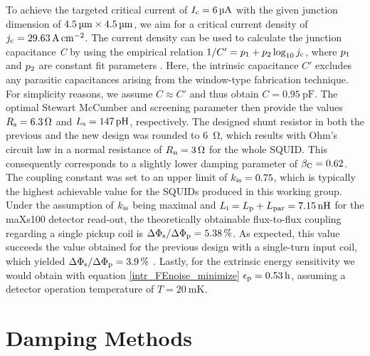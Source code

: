 
To achieve the targeted critical current of $I_{\rm c}=\qty{6}{\micro\ampere}$ with the given junction dimension of $\qtyproduct{4.5 x 4.5}{\micro\meter}$, we aim for a critical current density of $j_{\rm c}=\qty{29.63}{\ampere\per\cm\squared}$. The current density can be used to calculate the junction capacitance \textit{C} by using the empirical relation $1/C'=p_1 + p_2\log_{10}j_{\rm c}$, where $p_{\rm 1}$ and $p_{\rm 2}$ are constant fit parameters \cite{Maezawa1995}. Here, the intrinsic capacitance $C'$ excludes any parasitic capacitances arising from the window-type fabrication technique. For simplicity reasons, we assume $C\approx C'$ and thus obtain $C=\qty{0.95}{\pico\farad}$. The optimal Stewart McCumber and screening parameter then provide the values $R_{\rm s}=\qty{6.3}{\ohm}$ and $L_{\rm s}=\qty{147}{\pico\henry}$, respectively. The designed shunt resistor in both the previous and the new design was rounded to \qty{6}{\ohm}, which results with Ohm's circuit law in a normal resistance of $R_{\rm n}=\qty{3}{\ohm}$ for the whole SQUID. This consequently corresponds to a slightly lower damping parameter of $\beta_{\rm C}=0.62$. The coupling constant was set to an upper limit of $k_{\rm is}=0.75$, which is typically the highest achievable value for the SQUIDs produced in this working group. Under the assumption of $k_{\rm is}$ being maximal and $L_{\rm i}=L_{\rm p}+L_{\rm par}=\qty{7.15}{\nano\henry}$ for the maXs100 detector read-out, the theoretically obtainable flux-to-flux coupling regarding a single pickup coil is $\Delta\Phi_{\rm s}/\Delta\Phi_{\rm p}=\qty{5.38}{\percent}$. As expected, this value succeeds the value obtained for the previous design with a single-turn input coil, which yielded $\Delta\Phi_{\rm s}/\Delta\Phi_{\rm p}=\qty{3.9}{\percent}$ \cite{Bauer2022}. Lastly, for the extrinsic energy sensitivity we would obtain with equation \ref{intr_FEnoise_minimize} $\epsilon_{\rm p}=\qty{0.53}{h}$, assuming a detector operation temperature of $T=\qty{20}{\milli\kelvin}$.   

\section{Damping Methods} \label{sec_damping}


